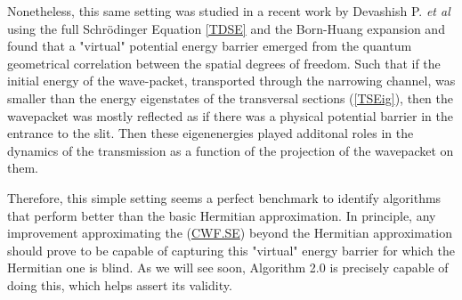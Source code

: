 \documentclass[11pt, a4paper]{article} %
\begin{document}
Nonetheless, this same setting was studied in a recent work by Devashish P. {\em et al} \cite{Dev} using the full Schrödinger Equation \ref{TDSE} and the Born-Huang expansion and found that a "virtual" potential energy barrier emerged from the quantum geometrical correlation between the spatial degrees of freedom. Such that if the initial energy of the wave-packet, transported through the narrowing channel, was smaller than the energy eigenstates of the transversal sections (\ref{TSEig}), then the wavepacket was mostly reflected as if there was a physical potential barrier in the entrance to the slit. Then these eigenenergies played additonal roles in the dynamics of the transmission as a function of the projection of the wavepacket on them. 

Therefore, this simple setting seems a perfect benchmark to identify algorithms that perform better than the basic Hermitian approximation. In principle, any improvement approximating the (\hyperref[CWF.SE]{CWF.SE}) beyond the Hermitian approximation should prove to be capable of capturing this "virtual" energy barrier for which the Hermitian one is blind. As we will see soon, Algorithm 2.0 is precisely capable of doing this, which helps assert its validity.
\end{document}
